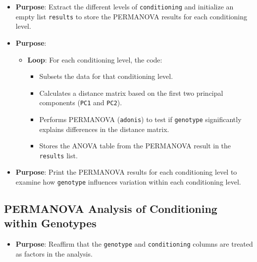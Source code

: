 \documentclass[
  11pt,
]{article}
\providecommand{\tightlist}{%
  \setlength{\itemsep}{0pt}\setlength{\parskip}{0pt}}\usepackage{longtable,booktabs,array}
\begin{document}
\begin{itemize}
\tightlist
\item
  \textbf{Purpose}: Extract the different levels of
  \texttt{conditioning} and initialize an empty list \texttt{results} to
  store the PERMANOVA results for each conditioning level.
\end{itemize}

\begin{itemize}
\tightlist
\item
  \textbf{Purpose}:

  \begin{itemize}
  \tightlist
  \item
    \textbf{Loop}: For each conditioning level, the code:

    \begin{itemize}
    \tightlist
    \item
      Subsets the data for that conditioning level.
    \item
      Calculates a distance matrix based on the first two principal
      components (\texttt{PC1} and \texttt{PC2}).
    \item
      Performs PERMANOVA (\texttt{adonis}) to test if \texttt{genotype}
      significantly explains differences in the distance matrix.
    \item
      Stores the ANOVA table from the PERMANOVA result in the
      \texttt{results} list.
    \end{itemize}
  \end{itemize}
\end{itemize}

\begin{itemize}
\tightlist
\item
  \textbf{Purpose}: Print the PERMANOVA results for each conditioning
  level to examine how \texttt{genotype} influences variation within
  each conditioning level.
\end{itemize}

\subsection{PERMANOVA Analysis of Conditioning within
Genotypes}\label{permanova-analysis-of-conditioning-within-genotypes}

\begin{itemize}
\tightlist
\item
  \textbf{Purpose}: Reaffirm that the \texttt{genotype} and
  \texttt{conditioning} columns are treated as factors in the analysis.
\end{itemize}
\end{document}
